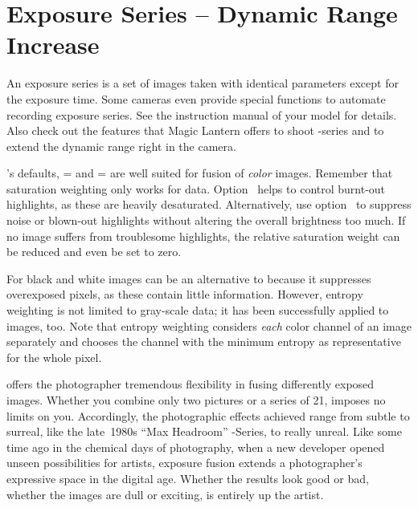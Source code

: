 \section[Exposure Series -- Dynamic Range Increase]{\label{sec:exposure-series--dynamic-range-increase}%
  Exposure Series -- Dynamic Range Increase}


An exposure series is a set of images taken with identical parameters except for the exposure
time.  Some cameras even provide special functions to automate recording exposure series.  See
the instruction manual of your model for details.  Also check out the features that Magic
Lantern offers to shoot -series and to extend the dynamic range right in the
camera.

\App{}'s defaults, = and
= are well suited for fusion of
\emph{color} images.  Remember that saturation weighting only works for  data.
Option~ helps to control burnt-out highlights, as these are heavily
desaturated.  Alternatively, use option~ to suppress noise or
blown-out highlights without altering the overall brightness too much.  If no image suffers from
troublesome highlights, the relative saturation weight can be reduced and even be set to zero.

For black and white images  can be an alternative to
 because it suppresses overexposed pixels, as these contain little
information.  However, entropy weighting is not limited to gray-scale data; it has been
successfully applied to  images, too.  Note that entropy weighting considers
\emph{each} color channel of an  image separately and chooses the channel with the
minimum entropy as representative for the whole pixel.

\App{} offers the photographer tremendous flexibility in fusing differently exposed images.
Whether you combine only two pictures or a series of 21, \App{} imposes no limits on you.
Accordingly, the photographic effects achieved range from subtle to surreal, like the late~1980s
``Max Headroom'' -Series, to really unreal.  Like some time ago in the chemical days
of photography, when a new developer opened unseen possibilities for artists, exposure fusion
extends a photographer's expressive space in the digital age.  Whether the results look good or
bad, whether the images are dull or exciting, is entirely up the artist.

